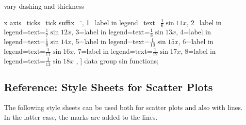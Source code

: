\begin{stylesheet}{vary dashing and thickness}
\begin{codeexample}
{{{    x axis={ticks={tick suffix=${}^\circ$}},
    1={label in legend={text=$\frac{1}{6}\sin 11x$}},
    2={label in legend={text=$\frac{1}{7}\sin 12x$}},
    3={label in legend={text=$\frac{1}{8}\sin 13x$}},
    4={label in legend={text=$\frac{1}{9}\sin 14x$}},
    5={label in legend={text=$\frac{1}{10}\sin 15x$}},
    6={label in legend={text=$\frac{1}{11}\sin 16x$}},
    7={label in legend={text=$\frac{1}{12}\sin 17x$}},
    8={label in legend={text=$\frac{1}{13}\sin 18x$}}
  }
}},
]
\tikz \datavisualization [
  visualize as smooth line/.list=
    {1,2,3,4,5,6,7,8},
  example visualization,
  style sheet=vary thickness,
  style sheet=vary dashing]
data group {sin functions};
\end{codeexample}
\end{stylesheet}


\subsection{Reference: Style Sheets for Scatter Plots}

The following style sheets can be used both for scatter plots and also with
lines. In the latter case, the marks are added to the lines.

